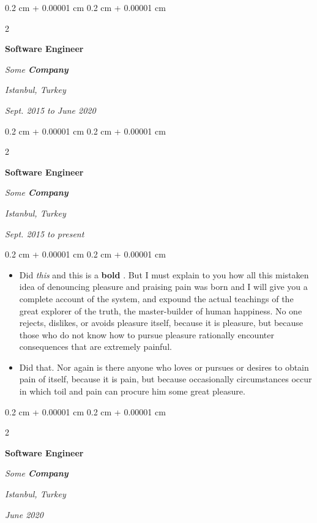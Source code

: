 \documentclass[10pt, letterpaper]{article}
\newenvironment{highlights}{
    \begin{itemize}[
        topsep=0.10 cm,
        parsep=0.10 cm,
        partopsep=0pt,
        itemsep=0pt,
        leftmargin=0.4 cm + 10pt
    ]
}{
    \end{itemize}
} %
\newenvironment{onecolentry}{
    \begin{adjustwidth}{
        0.2 cm + 0.00001 cm
    }{
        0.2 cm + 0.00001 cm
    }
}{
    \end{adjustwidth}
} %
\newenvironment{twocolentry}[2][]{
    \onecolentry
    \def\secondColumn{#2}
    \setcolumnwidth{\fill, 4.5 cm}
    \begin{paracol}{2}
}{
    \switchcolumn \raggedleft \secondColumn
    \end{paracol}
    \endonecolentry
} %
\let\hrefWithoutArrow\href
\renewcommand{\href}[2]{\hrefWithoutArrow{#1}{\mbox{\ifthenelse{\equal{#2}{}}{ }{#2 }\raisebox{.15ex}{\footnotesize \faExternalLink*}}}}
\begin{document}
        \vspace{0.2 cm-3px}

        \begin{twocolentry}{
        \textit{Istanbul, Turkey}    
            
        \textit{Sept. 2015 to June 2020}}
            \textbf{Software Engineer}
            
            \textit{Some \textbf{Company}}
        \end{twocolentry}



        \vspace{0.2 cm-3px}

        \begin{twocolentry}{
        \textit{Istanbul, Turkey}    
            
        \textit{Sept. 2015 to present}}
            \textbf{Software Engineer}
            
            \textit{Some \textbf{Company}}
        \end{twocolentry}

        \vspace{0.10 cm-3px}
        \begin{onecolentry}
            \begin{highlights}
                \item Did \textit{this} and this is a \textbf{bold} \href{https://example.com}{link}. But I must explain to you how all this mistaken idea of denouncing pleasure and praising pain was born and I will give you a complete account of the system, and expound the actual teachings of the great explorer of the truth, the master-builder of human happiness. No one rejects, dislikes, or avoids pleasure itself, because it is pleasure, but because those who do not know how to pursue pleasure rationally encounter consequences that are extremely painful.
                \item Did that. Nor again is there anyone who loves or pursues or desires to obtain pain of itself, because it is pain, but because occasionally circumstances occur in which toil and pain can procure him some great pleasure.
            \end{highlights}
        \end{onecolentry}


        \vspace{0.2 cm-3px}

        \begin{twocolentry}{
        \textit{Istanbul, Turkey}    
            
        \textit{June 2020}}
            \textbf{Software Engineer}
            
            \textit{Some \textbf{Company}}
        \end{twocolentry}
\end{document}
